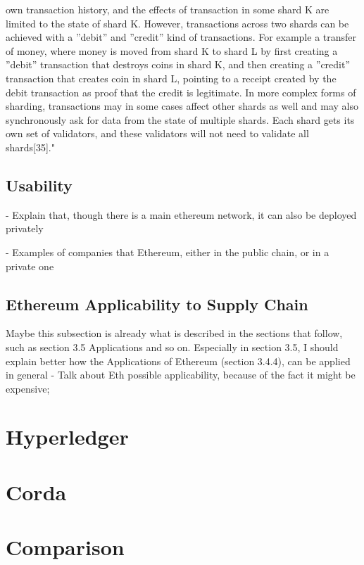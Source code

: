 own transaction history, and the effects of transaction in some shard K are limited to the
state of shard K. However, transactions across two shards can be achieved with a ”debit”
and ”credit” kind of transactions. For example a transfer of money, where money is moved
from shard K to shard L by first creating a ”debit” transaction that destroys coins in shard
K, and then creating a ”credit” transaction that creates coin in shard L, pointing to a receipt
created by the debit transaction as proof that the credit is legitimate. In more complex
forms of sharding, transactions may in some cases affect other shards as well and may also
synchronously ask for data from the state of multiple shards. Each shard gets its own set of
validators, and these validators will not need to validate all shards[35]."

\subsection{Usability}
- Explain that, though there is a main ethereum network, it can also be deployed privately

- Examples of companies that Ethereum, either in the public chain, or in a private one

\subsection{Ethereum Applicability to Supply Chain}
Maybe this subsection is already what is described in the sections that follow, such as section 3.5 Applications and so on. Especially in section 3.5, I should explain better how the Applications of Ethereum (section 3.4.4), can be applied in general
- Talk about Eth possible applicability, because of the fact it might be expensive;

\section{Hyperledger}

\section{Corda}

\section{Comparison}
